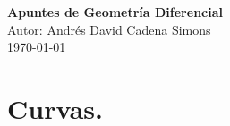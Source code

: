\documentclass[a4paper,12pt]{book}
\begin{document}
\begin{titlepage}
    \centering
    {\Huge \textbf{Apuntes de Geometría Diferencial}}\\[2cm]
    {\Large Autor: Andrés David Cadena Simons}\\[1cm]
    {\Large \today}
\end{titlepage}



\tableofcontents

\chapter{Curvas.}




  
\end{document}
